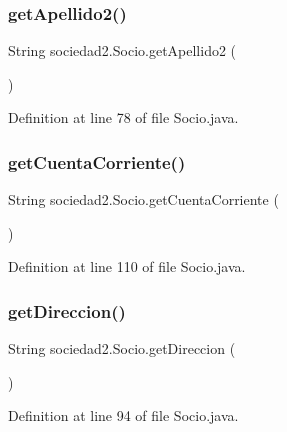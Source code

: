 \subsubsection{\texorpdfstring{get\+Apellido2()}{getApellido2()}}
{\footnotesize\ttfamily String sociedad2.\+Socio.\+get\+Apellido2 (\begin{DoxyParamCaption}{ }\end{DoxyParamCaption})}



Definition at line 78 of file Socio.\+java.

\mbox{\label{classsociedad2_1_1_socio_a29002325c998cb7888762c74d2bdcfea}} 
\subsubsection{\texorpdfstring{get\+Cuenta\+Corriente()}{getCuentaCorriente()}}
{\footnotesize\ttfamily String sociedad2.\+Socio.\+get\+Cuenta\+Corriente (\begin{DoxyParamCaption}{ }\end{DoxyParamCaption})}



Definition at line 110 of file Socio.\+java.

\mbox{\label{classsociedad2_1_1_socio_a29938889a9206620df5f22fce680d28f}} 
\subsubsection{\texorpdfstring{get\+Direccion()}{getDireccion()}}
{\footnotesize\ttfamily String sociedad2.\+Socio.\+get\+Direccion (\begin{DoxyParamCaption}{ }\end{DoxyParamCaption})}



Definition at line 94 of file Socio.\+java.

\mbox{\label{classsociedad2_1_1_socio_a3e0a22d240ae0ad0646fd753cc16d1ec}} 
